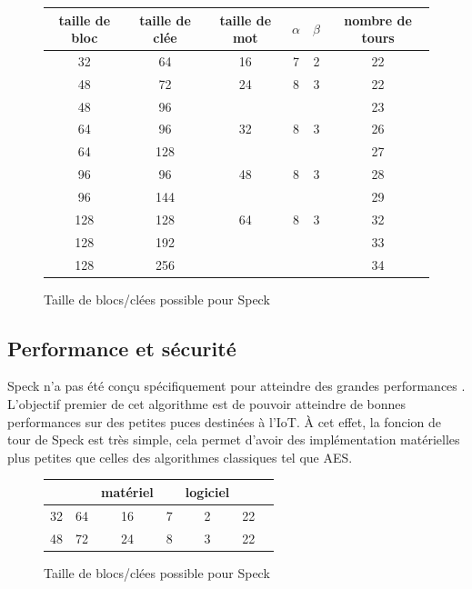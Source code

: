 			\begin{figure}[H]
				\centering
				\bgroup
				\def\arraystretch{1.2}
				\begin{tabular}{ccc|cc|c}
					taille de bloc & taille de clée & taille de mot & $\alpha$ & $\beta$ & nombre de tours \\
					\hline
					32 & 64  & 16 & 7 & 2 & 22 \\
					\hline
					48 & 72  & 24 & 8 & 3 & 22 \\
					48 & 96  &  & & & 23 \\
					\hline
					64 & 96  & 32 & 8 & 3 & 26 \\
					64 & 128 & &  & & 27 \\
					\hline
					96 & 96  & 48 & 8 & 3 & 28 \\
					96 & 144 & & & & 29 \\
					\hline
					128 & 128 & 64 & 8 & 3 & 32 \\
					128 & 192 & & & & 33 \\
					128 & 256 & & & & 34 \\
				\end{tabular}
				\egroup
				\caption{Taille de blocs/clées possible pour Speck}
			 	\label{tailleSpeck}
			\end{figure}

			\vspace{0.5cm}

		\subsection{Performance et sécurité}

			Speck n'a pas été conçu spécifiquement pour atteindre des grandes
			performances \cite{speck_families}. L'objectif premier de cet algorithme
			est de pouvoir atteindre de bonnes performances sur des petites puces
			destinées à l'IoT. À cet effet, la foncion de tour de Speck est très simple,
			cela permet d'avoir des implémentation matérielles plus petites que
			celles des algorithmes classiques tel que AES.

			\begin{figure}[H]
				\centering
				\bgroup
				\def\arraystretch{1.2}
				\begin{tabular}{cc|cc|ccc}
					& & matériel & & logiciel & & \\
					\hline
					32 & 64  & 16 & 7 & 2 & 22 \\
					\hline
					48 & 72  & 24 & 8 & 3 & 22 \\
				\end{tabular}
				\egroup
				\caption{Taille de blocs/clées possible pour Speck}
				\label{tailleSpeck}
			\end{figure}


